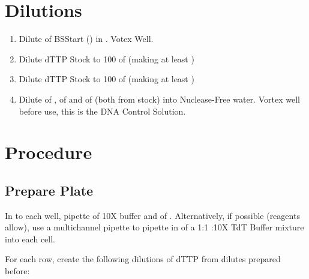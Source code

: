 \documentclass{ssiBio}
\begin{document}
\section{Dilutions}
\begin{enumerate}
    \item{Dilute  of BSStart () in . Votex Well.}
    \item{Dilute  dTTP Stock to 100\uL{} of  (making at least )}
    \item{Dilute  dTTP Stock to 100\uL{} of  (making at least )}
    \item{Dilute  of ,  of  and  of  (both from  stock) into  Nuclease-Free water. Vortex well before use, this is the DNA Control Solution.}
\end{enumerate}

\section{Procedure}%
\subsection{Prepare Plate}
In to each well, pipette  of 10X \tdt{} buffer and  of . Alternatively, if possible (reagents allow), use a multichannel pipette to pipette in  of a 1:1 :10X TdT Buffer mixture into each cell.

For each row, create the following dilutions of dTTP from dilutes prepared before:
\end{document}
